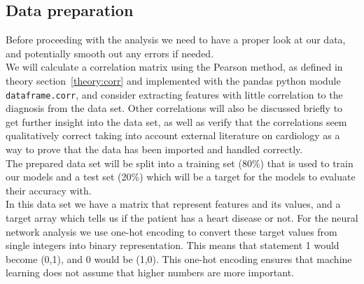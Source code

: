 \documentclass[reprint,english,notitlepage]{revtex4-1}  %
\begin{document}
\subsection{Data preparation}

Before proceeding with the analysis we need to have a proper look at our data, and potentially smooth out any errors if needed. 
\vspace{3mm}
\\
We will calculate a correlation matrix using the Pearson method, as defined in theory section~\ref{theory:corr} and implemented with the pandas python module {\lstinline[language={[python]TeX}, basicstyle=\ttfamily]|dataframe.corr|}, and consider extracting features with little correlation to the diagnosis from the data set. 
Other correlations will also be discussed briefly to get further insight into the data set, as well as verify that the correlations seem qualitatively correct taking into account external literature on cardiology as a way to prove that the data has been imported and handled correctly.
\vspace{3mm}
\\
The prepared data set will be split into a training set ($80\%$) that is used to train our models and a test set (20\%) which will be a target for the models to evaluate their accuracy with.
\vspace{3mm}
\\
In this data set we have a matrix that represent features and its values, and a target array which tells us if the patient has a heart disease or not. For the neural network analysis we use one-hot encoding to convert these target values from single integers into binary representation. This means that statement 1 would become (0,1), and 0 would be (1,0).
This one-hot encoding ensures that machine learning does not assume that higher numbers are more important.
\end{document}
